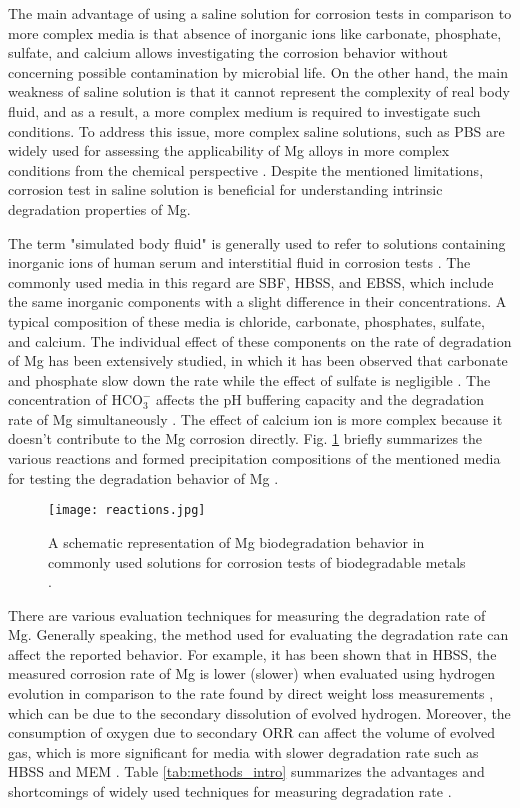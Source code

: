 The main advantage of using a saline solution for corrosion tests in comparison to more complex media is that absence of inorganic ions like carbonate, phosphate, sulfate, and calcium allows investigating the corrosion behavior without concerning possible contamination by microbial life. On the other hand, the main weakness of saline solution is that it cannot represent the complexity of real body fluid, and as a result, a more complex medium is required to investigate such conditions. To address this issue, more complex saline solutions, such as PBS are widely used for assessing the applicability of Mg alloys in more complex conditions from the chemical perspective \cite{Schille2011,Xue2012}. Despite the mentioned limitations, corrosion test in saline solution is beneficial for understanding intrinsic degradation properties of Mg. 


The term "simulated body fluid" is generally used to refer to solutions containing inorganic ions of human serum and interstitial fluid in corrosion tests \cite{Mei2020}. The commonly used media in this regard are SBF, HBSS, and EBSS, which include the same inorganic components with a slight difference in their concentrations. A typical composition of these media is chloride, carbonate, phosphates, sulfate, and calcium. The individual effect of these components on the rate of degradation of Mg has been extensively studied, in which it has been observed that carbonate and phosphate slow down the rate while the effect of sulfate is negligible \cite{Johnston2017,Mei2019a}. The concentration of $\mathrm{HCO}_{3}^{-}$ affects the pH buffering capacity and the degradation rate of Mg simultaneously \cite{Xin2011}. The effect of calcium ion is more complex because it doesn't contribute to the Mg corrosion directly. Fig. \ref{fig:reactions_intro} briefly summarizes the various reactions and formed precipitation compositions of the mentioned media for testing the degradation behavior of Mg \cite{Mei2020}.


\begin{figure}
\centering
\medskip
\texttt{[image: reactions.jpg]}
\caption[Mg biodegradation behavior in commonly used test solutions]{A schematic representation of Mg biodegradation behavior in commonly used solutions for corrosion tests of biodegradable metals \cite{Mei2020}.} \label{fig:reactions_intro}
\end{figure}


There are various evaluation techniques for measuring the degradation rate of Mg. Generally speaking, the method used for evaluating the degradation rate can affect the reported behavior. For example, it has been shown that in HBSS, the measured corrosion rate of Mg is lower (slower) when evaluated using  hydrogen evolution in comparison to the rate found by direct weight loss measurements \cite{Johnston2015,Johnston2019}, which can be due to the secondary dissolution of evolved hydrogen. Moreover, the consumption of oxygen due to secondary ORR can affect the volume of evolved gas, which is more significant for media with slower degradation rate such as HBSS and MEM \cite{Wang2020}. Table \ref{tab:methods_intro} summarizes the advantages and shortcomings of widely used techniques for measuring degradation rate \cite{Mei2020}. 


